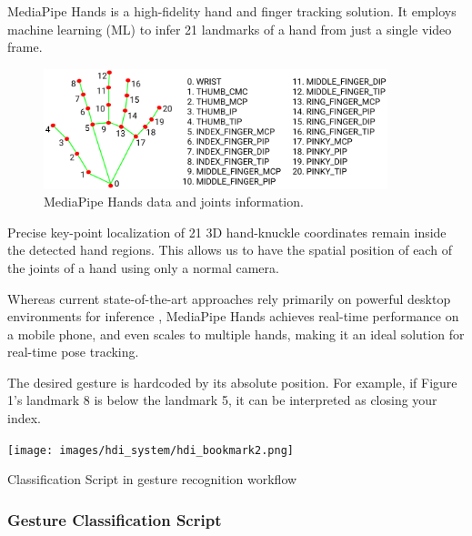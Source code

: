 
 MediaPipe Hands \cite{48292} is a high-fidelity hand and finger tracking solution. It employs machine learning (ML) to infer 21 landmarks of a hand from just a single video frame. 

\begin{figure}[h]
    \raggedright
    \includegraphics[width=10cm]{images/hand_landmarks.png}
    \caption{MediaPipe Hands data and joints information.}
\end{figure}

Precise key-point localization of 21 3D hand-knuckle coordinates remain inside the detected hand regions. This allows us to have the spatial position of each of the joints of a hand using only a normal camera.

Whereas current state-of-the-art approaches rely primarily on powerful desktop environments for inference \cite{liu_szirányi_2021}, MediaPipe Hands achieves real-time performance on a mobile phone, and even scales to multiple hands, making it an ideal solution for real-time pose tracking.


The desired gesture is hardcoded by its absolute position. For example, if Figure 1’s landmark 8 is below the landmark 5, it can be interpreted as closing your index. 

\begin{marginfigure}%
\vspace{2cm}
  \hspace{1cm}\texttt{[image: images/hdi\_system/hdi\_bookmark2.png]}
  \caption{Classification Script in gesture recognition workflow}
\end{marginfigure}
\subsubsection{Gesture Classification Script}

